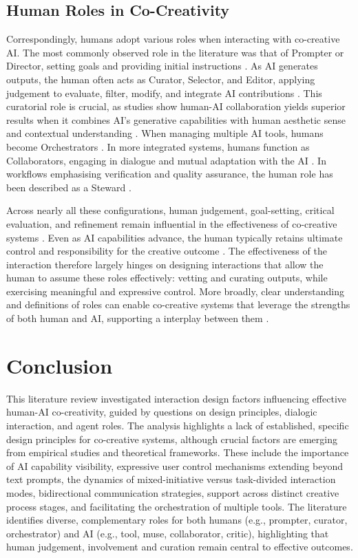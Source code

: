 \subsection{Human Roles in Co-Creativity}
Correspondingly, humans adopt various roles when interacting with co-creative AI. The most commonly observed role in the literature was that of Prompter or Director, setting goals and providing initial instructions \cite{Oh2018-mu, Wan2023-he}. As AI generates outputs, the human often acts as Curator, Selector, and Editor, applying judgement to evaluate, filter, modify, and integrate AI contributions \cite{Hitsuwari2023-tw, Wu2025-or, Huang2020-fh}. This curatorial role is crucial, as studies show human-AI collaboration yields superior results when it combines AI's generative capabilities with human aesthetic sense and contextual understanding \cite{Hitsuwari2023-tw, Wu2025-or}. When managing multiple AI tools, humans become Orchestrators \cite{Palani2024-on}. In more integrated systems, humans function as Collaborators, engaging in dialogue and mutual adaptation with the AI \cite{Lawton2023-tb, Wan2023-he}. In workflows emphasising verification and quality assurance, the human role has been described as a Steward \cite{Lee2025-dw}.

Across nearly all these configurations, human judgement, goal-setting, critical evaluation, and refinement remain influential in the effectiveness of co-creative systems \cite{Li2024-yh, Hitsuwari2023-tw, Sarkar2023-ee}. Even as AI capabilities advance, the human typically retains ultimate control and responsibility for the creative outcome \cite{Shneiderman2020-ue, Li2024-yh}. The effectiveness of the interaction therefore largely hinges on designing interactions that allow the human to assume these roles effectively: vetting and curating outputs, while exercising meaningful and expressive control. More broadly, clear understanding and definitions of roles can enable co-creative systems that leverage the strengths of both human and AI, supporting a interplay between them \cite{Guzdial2019-cv, Moruzzi2024-cq, Weisz2024-io}.

\section{Conclusion}

This literature review investigated interaction design factors influencing effective human-AI co-creativity, guided by questions on design principles, dialogic interaction, and agent roles. The analysis highlights a lack of established, specific design principles for co-creative systems, although crucial factors are emerging from empirical studies and theoretical frameworks. These include the importance of AI capability visibility, expressive user control mechanisms extending beyond text prompts, the dynamics of mixed-initiative versus task-divided interaction modes, bidirectional communication strategies, support across distinct creative process stages, and facilitating the orchestration of multiple tools. The literature identifies diverse, complementary roles for both humans (e.g., prompter, curator, orchestrator) and AI (e.g., tool, muse, collaborator, critic), highlighting that human judgement, involvement and curation remain central to effective outcomes. 
